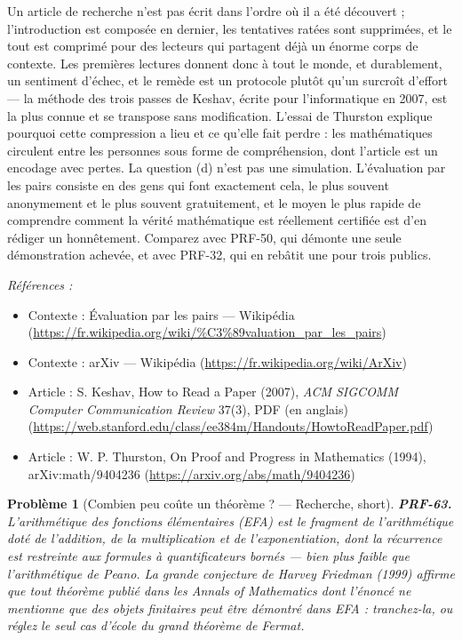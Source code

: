 \documentclass[11pt]{article}
\newtheorem{problem}{Problème}
\newenvironment{refs}{\par\small\noindent\emph{Références :}\begin{itemize}\setlength\itemsep{0pt}}{\end{itemize}\normalsize}
\begin{document}
\noindent Un article de recherche n'est pas écrit dans l'ordre où il a été
découvert ; l'introduction est composée en dernier, les tentatives ratées sont supprimées, et
le tout est comprimé pour des lecteurs qui partagent déjà un énorme corps de contexte. Les
premières lectures donnent donc à tout le monde, et durablement, un sentiment d'échec, et le
remède est un protocole plutôt qu'un surcroît d'effort --- la méthode des trois passes de
Keshav, écrite pour l'informatique en 2007, est la plus connue et se transpose sans
modification. L'essai de Thurston explique pourquoi cette compression a lieu et ce qu'elle
fait perdre : les mathématiques circulent entre les personnes sous forme de compréhension,
dont l'article est un encodage avec pertes. La question (d) n'est pas une simulation.
L'évaluation par les pairs consiste en des gens qui font exactement cela, le plus souvent
anonymement et le plus souvent gratuitement, et le moyen le plus rapide de comprendre comment
la vérité mathématique est réellement certifiée est d'en rédiger un honnêtement. Comparez avec
PRF-50, qui démonte une seule démonstration achevée, et avec PRF-32, qui en rebâtit une pour
trois publics.

\begin{refs}
\item Contexte : Évaluation par les pairs --- Wikipédia (\url{https://fr.wikipedia.org/wiki/%C3%89valuation_par_les_pairs})
\item Contexte : arXiv --- Wikipédia (\url{https://fr.wikipedia.org/wiki/ArXiv})
\item Article : S. Keshav, \og{} How to Read a Paper \fg{} (2007), \textit{ACM SIGCOMM Computer Communication Review} 37(3), PDF (en anglais) (\url{https://web.stanford.edu/class/ee384m/Handouts/HowtoReadPaper.pdf})
\item Article : W. P. Thurston, \og{} On Proof and Progress in Mathematics \fg{} (1994), arXiv:math/9404236 (\url{https://arxiv.org/abs/math/9404236})
\end{refs}

\bigskip

\begin{problem}[{Combien peu coûte un théorème ? --- Recherche, short}]
\textbf{PRF-63.} L'arithmétique des fonctions élémentaires (EFA) est le
fragment de l'arithmétique doté de l'addition, de la multiplication et de l'exponentiation,
dont la récurrence est restreinte aux formules à quantificateurs bornés --- bien plus faible
que l'arithmétique de Peano. La grande conjecture de Harvey Friedman (1999) affirme que tout
théorème publié dans les \textit{Annals of Mathematics} dont l'énoncé ne mentionne que des
objets finitaires peut être démontré dans EFA : tranchez-la, ou réglez le seul cas d'école du
grand théorème de Fermat.
\end{problem}
\end{document}
